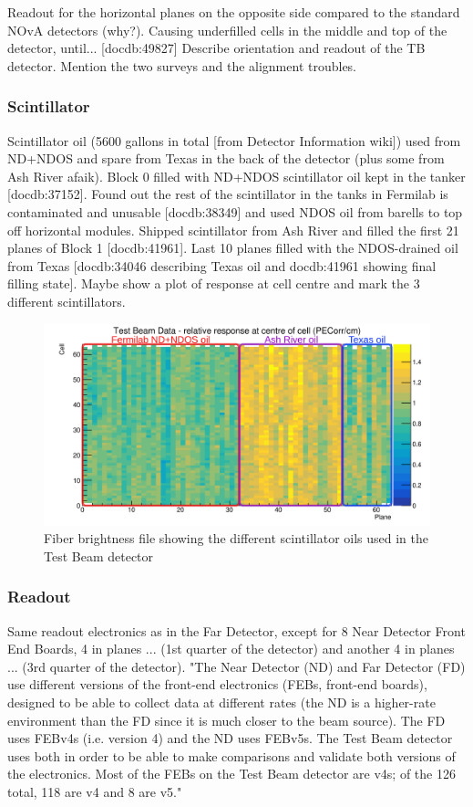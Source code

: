 \documentclass[12pt,a4paper]{article}
\begin{document}
Readout for the horizontal planes on the opposite side compared to the standard NOvA detectors (why?). Causing underfilled cells in the middle and top of the detector, until... [docdb:49827]
Describe orientation and readout of the TB detector.
Mention the two surveys and the alignment troubles.

\subsubsection*{Scintillator}
Scintillator oil (5600 gallons in total [from Detector Information wiki]) used from ND+NDOS and spare from Texas in the back of the detector (plus some from Ash River afaik).
Block 0 filled with ND+NDOS scintillator oil kept in the tanker [docdb:37152]. Found out the rest of the scintillator in the tanks in Fermilab is contaminated and unusable [docdb:38349] and used NDOS oil from barells to top off horizontal modules.
Shipped scintillator from Ash River and filled the first 21 planes of Block 1 [docdb:41961]. Last 10 planes filled with the NDOS-drained oil from Texas [docdb:34046 describing Texas oil and docdb:41961 showing final filling state].
Maybe show a plot of response at cell centre and mark the 3 different scintillators.

\begin{figure}[hbtp]
\centering
\includegraphics[width=\textwidth]{Plots/TestBeamScintillatorOils.png}
\caption{Fiber brightness file showing the different scintillator oils used in the Test Beam detector}
\end{figure}

\subsubsection*{Readout}
Same readout electronics as in the Far Detector, except for 8 Near Detector Front End Boards, 4 in planes ... (1st quarter of the detector) and another 4 in planes ... (3rd quarter of the detector).
"The Near Detector (ND) and Far Detector (FD) use different versions of the front-end electronics (FEBs, front-end boards), designed to be able to collect data at different rates (the ND is a higher-rate environment than the FD since it is much closer to the beam source). The FD uses FEBv4s (i.e. version 4) and the ND uses FEBv5s. The Test Beam detector uses both in order to be able to make comparisons and validate both versions of the electronics. Most of the FEBs on the Test Beam detector are v4s; of the 126 total, 118 are v4 and 8 are v5."%
\end{document}
